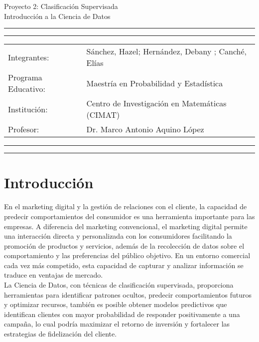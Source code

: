 \documentclass[10pt]{article}
\newcommand{\studentname}{Sánchez, Hazel; Hernández, Debany ; Canché, Elías}
\newcommand{\researchcentre}{Maestría en Probabilidad y Estadística}
\newcommand{\institution}{Centro de Investigación en Matemáticas (CIMAT)}
\newcommand{\supervisor}{Dr. Marco Antonio Aquino López}
\begin{document}
\begin{center}
{\Large{Proyecto 2: Clasificación Supervisada}} \\
\vspace{2mm}
{\Large{Introducción a la Ciencia de Datos}} \\
\end{center}

\vspace{5mm}
\hrule
\vspace{1mm}
\hrule

\vspace{3mm}
\begin{tabular}{ll} 
Integrantes:           	        & {\studentname}   \\ 
Programa Educativo: 	        & {\researchcentre}  \\ 
Institución:                 & {\institution}  \\
Profesor: 	                 & {\supervisor}  \\ 
\end{tabular}

\vspace{3mm}
\hrule
\vspace{1mm}
\hrule


\section{Introducción}
En el marketing digital y la gestión de relaciones con el cliente, la capacidad de predecir comportamientos del consumidor es una herramienta importante para las empresas. A diferencia del marketing convencional, el marketing digital permite una interacción directa y personalizada con los consumidores facilitando la promoción de productos y servicios, además de la recolección de datos sobre el comportamiento y las preferencias del público objetivo. En un entorno comercial cada vez más competido, esta capacidad de capturar y analizar información se traduce en ventajas de mercado.\\

La Ciencia de Datos, con técnicas de clasificación supervisada, proporciona herramientas para identificar patrones ocultos, predecir comportamientos futuros y optimizar recursos, también es posible obtener modelos predictivos que identifican clientes con mayor probabilidad de responder positivamente a una campaña, lo cual podría maximizar el retorno de inversión y fortalecer las estrategias de fidelización del cliente.\\
\end{document}
